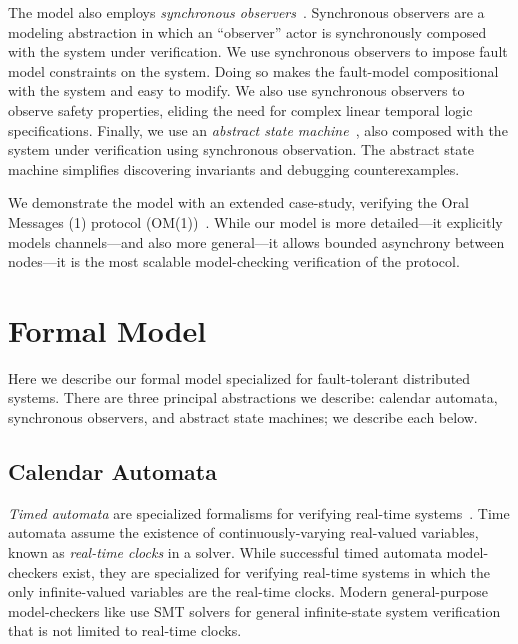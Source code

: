 \documentclass{IEEEtran/IEEEtran}
\newcommand{\lee}[1]{ } %
\newcommand{\lee}[1]{ {\color{blue}$<$lee: #1$>$} } %
\begin{document}
The model also employs \emph{synchronous observers}~\cite{}. Synchronous observers are a modeling abstraction in which an ``observer'' actor is synchronously composed with the system under verification. We use synchronous observers to impose fault model constraints on the system. Doing so makes the fault-model compositional with the system and easy to modify. We also use synchronous observers to observe safety properties, eliding the need for complex linear temporal logic specifications. Finally, we use an \emph{abstract state machine}~\cite{}, also composed with the system under verification using synchronous observation. The abstract state machine simplifies discovering invariants and debugging counterexamples.

We demonstrate the model with an extended case-study, verifying the Oral Messages (1) protocol (OM(1))~\cite{}. While our model is more detailed---it explicitly models channels---and also more general---it allows bounded asynchrony between nodes---it is the most scalable model-checking verification of the protocol.

\lee{finish intro...}



\section{Formal Model}\label{sec:model}
Here we describe our formal model specialized for fault-tolerant distributed systems. There are three principal abstractions we describe: calendar automata, synchronous observers, and abstract state machines; we describe each below.

\subsection{Calendar Automata}\label{sec:calendar}
\emph{Timed automata} are specialized formalisms for verifying real-time systems~\cite{}. Time automata assume the existence of continuously-varying real-valued variables, known as \emph{real-time clocks} in a solver. While successful timed automata model-checkers exist, they are specialized for verifying real-time systems in which the only infinite-valued variables are the real-time clocks. Modern general-purpose model-checkers like \lee{name some} use SMT solvers for general infinite-state system verification that is not limited to real-time clocks.
\end{document}

